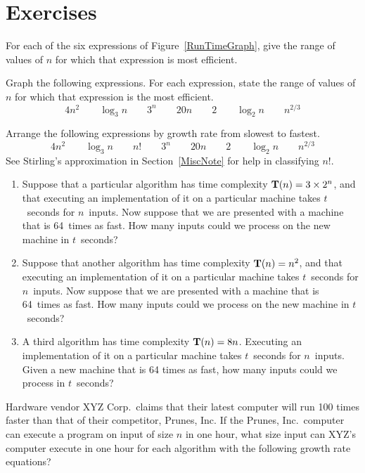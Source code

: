 \section{Exercises}

\begin{exercises}

\item
For each of the six expressions of Figure~\ref{RunTimeGraph}, give
the range of values of \(n\) for which that expression is most
efficient.

\item
Graph the following expressions.
For each expression, state the range of values of \(n\) for which that
expression is the most efficient.
\[4n^2\qquad \log_3 n\qquad 3^n\qquad 20n\qquad 2 \qquad \log_2 n
\qquad n^{2/3}\]

\item
Arrange the following expressions by growth rate from slowest to
fast\-est.
\[4n^2\qquad \log_3 n\qquad n!\qquad 3^n\qquad 20n\qquad 2
\qquad \log_2 n \qquad n^{2/3}\]
See Stirling's approximation in Section~\ref{MiscNote} for help in
classifying \(n!\).

\item
\begin{enumerate}
\item
Suppose that a particular algorithm has time complexity
\(\mbox{$\textbf{T}(n)$} = 3 \times 2^n\), and that executing an implementation of
it on a particular machine takes \(t\)~seconds for \(n\)~inputs.
Now suppose that we are presented with a machine that is 64~times as
fast.
How many inputs could we process on the new machine in \(t\)~seconds?

\item
Suppose that another algorithm has time complexity \(\mbox{$\textbf{T}(n)$} = n^2\), 
and that executing an implementation of it on a
particular machine takes \(t\)~seconds for \(n\)~inputs.
Now suppose that we are presented with a machine that is 64~times as
fast.
How many inputs could we process on the new machine in \(t\)~seconds?

\item
A third algorithm has time complexity \(\mbox{$\textbf{T}(n)$} = 8n\).
Executing an implementation of it on a particular machine takes
\(t\)~seconds for \(n\)~inputs.
Given a new machine that is 64 times as fast, how many inputs could we
process in \(t\)~seconds?

\end{enumerate}

\item
Hardware vendor XYZ Corp.\ claims that their latest computer will
run 100 times faster than that of their competitor, Prunes, Inc.
If the Prunes, Inc.\ computer can execute a program on input of size
\(n\) in one hour, what size input can XYZ's computer execute in one
hour for each algorithm with the following growth rate equations?


\end{exercises}
